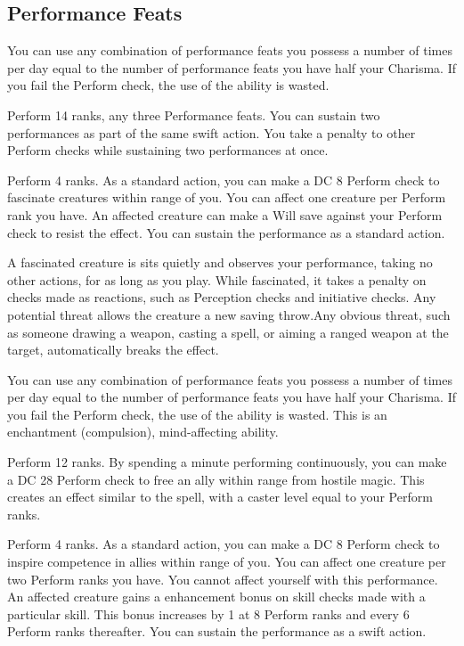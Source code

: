 \subsection{Performance Feats}

You can use any combination of performance feats you possess a number of times per day equal to the number of performance feats you have \add half your Charisma. If you fail the Perform check, the use of the ability is wasted.

\featpres Perform 14 ranks, any three Performance feats.
\featben You can sustain two performances as part of the same swift action. You take a  penalty to other Perform checks while sustaining two performances at once.

\featpre Perform 4 ranks.
\featben As a standard action, you can make a DC 8 Perform check to fascinate creatures within \rngmed range of you. You can affect one creature per Perform rank you have. An affected creature can make a Will save against your Perform check to resist the effect. You can sustain the performance as a standard action.

A fascinated creature is sits quietly and observes your performance, taking no other actions, for as long as you play. While fascinated, it takes a  penalty on checks made as reactions, such as Perception checks and initiative checks. Any potential threat allows the creature a new saving throw.Any obvious threat, such as someone drawing a weapon, casting a spell, or aiming a ranged weapon at the target, automatically breaks the effect.

You can use any combination of performance feats you possess a number of times per day equal to the number of performance feats you have \add half your Charisma. If you fail the Perform check, the use of the ability is wasted. This is an enchantment (compulsion), mind-affecting ability.

\featpre Perform 12 ranks.
\featben By spending a minute performing continuously, you can make a DC 28 Perform check to free an ally within \rngmed range from hostile magic. This creates an effect similar to the  spell, with a caster level equal to your Perform ranks.

\featpre Perform 4 ranks.
\featben As a standard action, you can make a DC 8 Perform check to inspire competence in allies within \rngmed range of you. You can affect one creature per two Perform ranks you have. You cannot affect yourself with this performance. An affected creature gains a  enhancement bonus on skill checks made with a particular skill. This bonus increases by 1 at 8 Perform ranks and every 6 Perform ranks thereafter. You can sustain the performance as a swift action.

